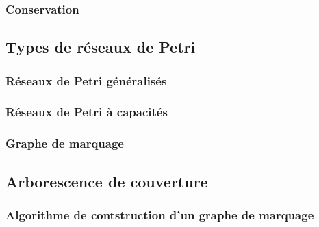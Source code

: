 \documentclass[11pt]{beamer}
\begin{document}
	\subsubsection{ Conservation                       }
		\begin{frame}
	\frametitle{}
	\end{frame}
	\subsection{ Types de réseaux de Petri                    }
		\begin{frame}
	\frametitle{}
	\end{frame}
	\subsubsection{ Réseaux de Petri généralisés               }
		\begin{frame}
	\frametitle{}
	\end{frame}
	\subsubsection{ Réseaux de Petri à capacités              }
		\begin{frame}
	\frametitle{}
	\end{frame}
	\subsubsection{ Graphe de marquage                   }
		\begin{frame}
	\frametitle{}
	\end{frame}
	\subsection{ Arborescence de couverture                   }
		\begin{frame}
	\frametitle{}
	\end{frame}
	\subsubsection{ Algorithme de contstruction d’un graphe de marquage}
		\begin{frame}
	\frametitle{}
	\end{frame}
\end{document}
